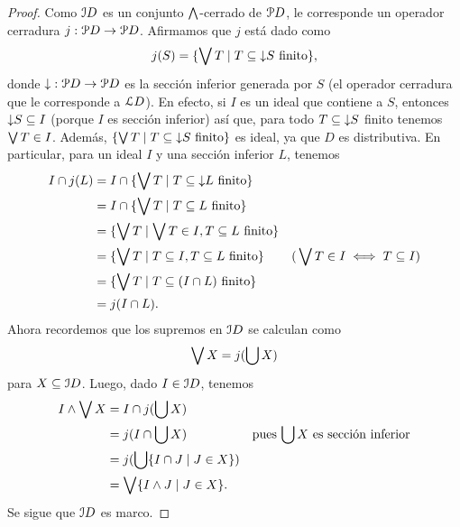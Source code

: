 \begin{proof}
    Como $\cal ID$ es un conjunto $\Inf$-cerrado de $\cal PD$,
    le corresponde un operador cerradura $j:\cal PD\to\cal PD$.
    Afirmamos que $j$ está dado como
    \[
        j(S) = \{\Sup T\mid T\subseteq\down S\text{ finito}\},
    \]
    donde $\down:\cal PD\to\cal PD$ es la sección inferior
    generada por $S$ (el operador
    cerradura que le corresponde a $\cal LD$).
    En efecto, si $I$ es un ideal que contiene a $S$,
    entonces $\down S\subseteq I$ (porque $I$ es sección inferior)
    así que, para todo $T\subseteq\down S$ finito tenemos
    $\Sup T\in I$.
    Además, $\{\Sup T\mid T\subseteq\down S\text{ finito}\}$
    es ideal, ya que $D$ es distributiva.
    En particular, para un ideal $I$ y una sección inferior $L$,
    tenemos
    \begin{align*}
        I\cap j(L)
        &= I\cap\{\Sup T\mid T\subseteq\down L\text{ finito}\} \\
        &= I\cap\{\Sup T\mid T\subseteq L\text{ finito}\} \\
        &= \{\Sup T\mid\Sup T\in I,T\subseteq L\text{ finito}\}
        \\
        &= \{\Sup T\mid T\subseteq I,T\subseteq L\text{ finito}\}
            & \text{(}\Sup T\in I \iff T\subseteq I\text{)} \\
        &= \{\Sup T\mid T\subseteq(I\cap L)\text{ finito}\} \\
        &= j(I\cap L).
    \end{align*}
    Ahora recordemos que los supremos en $\cal ID$ se calculan como
    \[
        \Sup X = j(\bigcup X)
    \]
    para $X\subseteq\cal ID$.
    Luego, dado $I\in\cal ID$, tenemos
    \begin{align*}
        I\inf\Sup X
        &= I\cap j(\bigcup X) \\
        &= j(I\cap\bigcup X)
            &\text{pues $\bigcup X$ es sección inferior} \\
        &= j(\bigcup\{I\cap J\mid J\in X\}) \\
        &= \Sup\{I\inf J\mid J\in X\}.
    \end{align*}
    Se sigue que $\cal ID$ es marco.
\end{proof}

